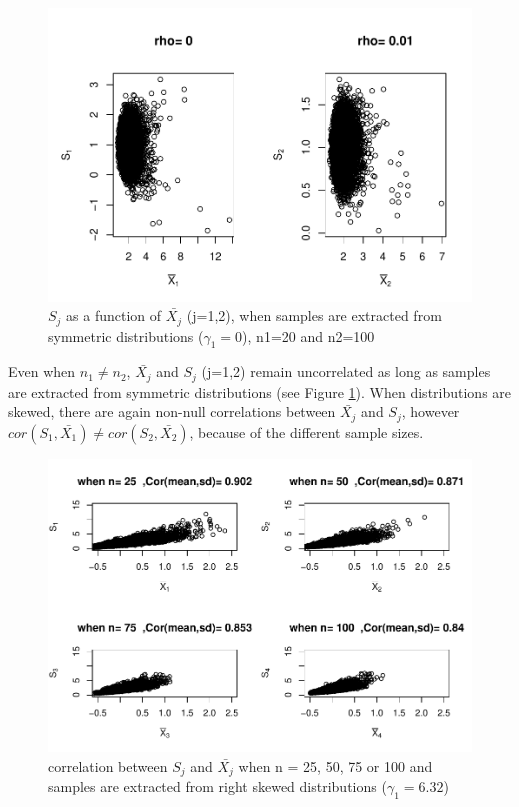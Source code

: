 \documentclass[
  man]{apa6}
\begin{document}
\begin{figure}
\centering
\includegraphics{Correlations-between-the-sample-means-difference-and-standardizers-of-all-estimators,-and-implications-on-biases-and-variances-of-all-estimators_files/figure-latex/pltSDMEANHomunbalsym-1.pdf}
\caption{\label{fig:pltSDMEANHomunbalsym}\(S_j\) as a function of \(\bar{X_j}\) (j=1,2), when samples are extracted from symmetric distributions (\(\gamma_1 = 0\)), n1=20 and n2=100}
\end{figure}

Even when \(n_1 \neq n_2\), \(\bar{X_j}\) and \(S_j\) (j=1,2) remain uncorrelated as long as samples are extracted from symmetric distributions (see Figure \ref{fig:pltSDMEANHomunbalsym}). When distributions are skewed, there are again non-null correlations between \(\bar{X_j}\) and \(S_j\), however \(cor(S_1,\bar{X_1}) \neq cor(S_2,\bar{X_2})\), because of the different sample sizes.

\begin{figure}
\centering
\includegraphics{Correlations-between-the-sample-means-difference-and-standardizers-of-all-estimators,-and-implications-on-biases-and-variances-of-all-estimators_files/figure-latex/Homunbalcorasafctofn1-1.pdf}
\caption{\label{fig:Homunbalcorasafctofn1}correlation between \(S_j\) and \(\bar{X_j}\) when n = 25, 50, 75 or 100 and samples are extracted from right skewed distributions (\(\gamma_1 = 6.32\))}
\end{figure}
\end{document}
